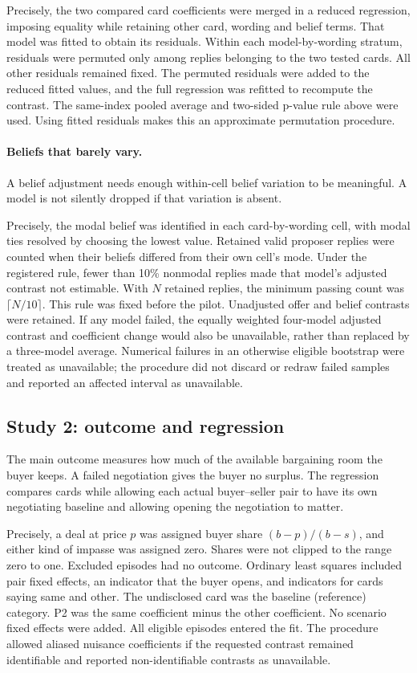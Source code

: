 Precisely, the two compared card coefficients were merged in a reduced regression, imposing equality while retaining other card, wording and belief terms. That model was fitted to obtain its residuals. Within each model-by-wording stratum, residuals were permuted only among replies belonging to the two tested cards. All other residuals remained fixed. The permuted residuals were added to the reduced fitted values, and the full regression was refitted to recompute the contrast. The same-index pooled average and two-sided p-value rule above were used. Using fitted residuals makes this an approximate permutation procedure.

\paragraph{Beliefs that barely vary.}
A belief adjustment needs enough within-cell belief variation to be meaningful. A model is not silently dropped if that variation is absent.

Precisely, the modal belief was identified in each card-by-wording cell, with modal ties resolved by choosing the lowest value. Retained valid proposer replies were counted when their beliefs differed from their own cell's mode. Under the registered rule, fewer than 10\% nonmodal replies made that model's adjusted contrast not estimable. With $N$ retained replies, the minimum passing count was $\lceil N/10\rceil$. This rule was fixed before the pilot. Unadjusted offer and belief contrasts were retained. If any model failed, the equally weighted four-model adjusted contrast and coefficient change would also be unavailable, rather than replaced by a three-model average. Numerical failures in an otherwise eligible bootstrap were treated as unavailable; the procedure did not discard or redraw failed samples and reported an affected interval as unavailable.

\subsection{Study 2: outcome and regression}
\label{subapp:study-2-outcome-and-regression}
The main outcome measures how much of the available bargaining room the buyer keeps. A failed negotiation gives the buyer no surplus. The regression compares cards while allowing each actual buyer--seller pair to have its own negotiating baseline and allowing opening the negotiation to matter.

Precisely, a deal at price $p$ was assigned buyer share $(b-p)/(b-s)$, and either kind of impasse was assigned zero. Shares were not clipped to the range zero to one. Excluded episodes had no outcome. Ordinary least squares included pair fixed effects, an indicator that the buyer opens, and indicators for cards saying same and other. The undisclosed card was the baseline (reference) category. P2 was the same coefficient minus the other coefficient. No scenario fixed effects were added. All eligible episodes entered the fit. The procedure allowed aliased nuisance coefficients if the requested contrast remained identifiable and reported non-identifiable contrasts as unavailable.

